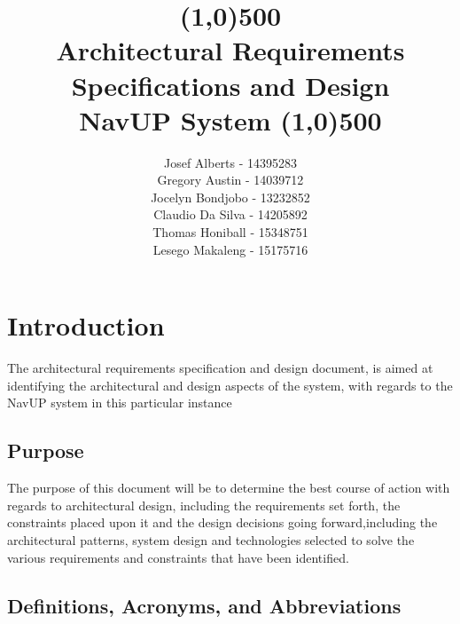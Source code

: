 \documentclass{article}
\begin{document}
	
	\title{
		\line(1,0){500}\\
		[6mm]
		\bfseries Architectural Requirements Specifications and Design 
		\\
		[6mm] 
		NavUP System
		\line(1,0){500}\\
		[15mm]}
	
	\author{
		Josef Alberts - 14395283\\ 
		Gregory Austin - 14039712\\ 
		Jocelyn Bondjobo - 13232852\\ 
		Claudio Da Silva - 14205892\\ 
		Thomas Honiball - 15348751\\
		Lesego Makaleng - 15175716}
	
	\maketitle{}
	\pagebreak
	\tableofcontents
	\pagebreak

		
	\section{Introduction}
	
	The architectural requirements specification and design document, is aimed at identifying the architectural and design aspects of the system, with regards to the NavUP system in this particular instance
	
		\subsection{Purpose}
		
		The purpose of this document will be to determine the best course of action with regards to architectural design, including the requirements set forth, the constraints placed upon it and the design decisions going forward,including the architectural patterns, system design and technologies selected to solve the various requirements and constraints that have been identified.
	
		\subsection{Definitions, Acronyms, and Abbreviations}
			
\end{document}
